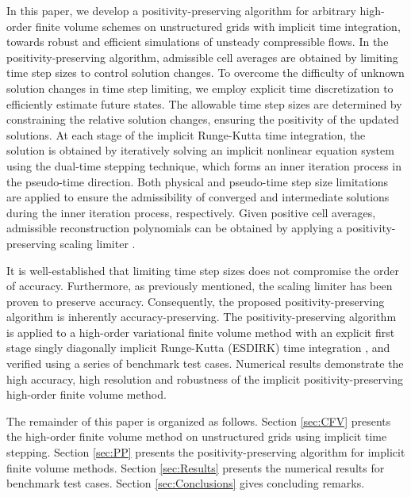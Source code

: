 {In this paper, we develop a positivity-preserving algorithm for arbitrary high-order finite volume schemes on unstructured grids with implicit time integration, towards robust and efficient simulations of unsteady compressible flows.
In the positivity-preserving algorithm, admissible cell averages are obtained by limiting time step sizes to control solution changes. To overcome the difficulty of unknown solution changes in time step limiting, we employ explicit time discretization to efficiently estimate future states. 
The allowable time step sizes are determined by constraining the relative solution changes, ensuring the positivity of the updated solutions. At each stage of the implicit Runge-Kutta time integration, the solution is obtained by iteratively solving an implicit nonlinear equation system using the dual-time stepping technique, which forms an inner iteration process in the pseudo-time direction. Both physical and pseudo-time step size limitations are applied to ensure the admissibility of converged and intermediate solutions during the inner iteration process, respectively.
Given positive cell averages, admissible reconstruction polynomials can be obtained by applying a positivity-preserving scaling limiter \cite{zhang2010positivity}.} 

It is well-established that limiting time step sizes does not compromise the order of accuracy. Furthermore, as previously mentioned, the scaling limiter has been proven to preserve accuracy. Consequently, the proposed positivity-preserving algorithm is inherently accuracy-preserving. 
The positivity-preserving algorithm is applied to a high-order variational finite volume method \cite{wang2017compact_VR} with an explicit first stage singly diagonally implicit Runge-Kutta (ESDIRK) time integration \cite{bijl2002implicitBDFvESDIRK}, and verified using a series of benchmark test cases. Numerical results demonstrate the high accuracy, high resolution and robustness of the implicit positivity-preserving high-order finite volume method.

The remainder of this paper is organized as follows. Section \ref{sec:CFV} presents the high-order finite volume method on unstructured grids using implicit time stepping. Section \ref{sec:PP} presents the positivity-preserving algorithm for implicit finite volume methods. 
Section \ref{sec:Results} presents the numerical results for benchmark test cases. Section \ref{sec:Conclusions} gives concluding remarks.